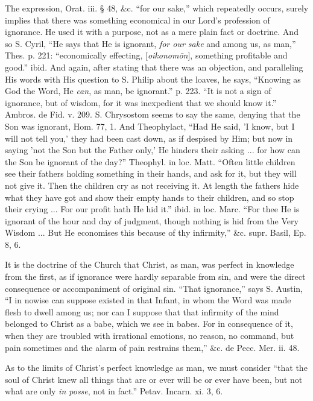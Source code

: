 The expression, Orat. iii. § 48, \&c. ``for
our sake,'' which repeatedly occurs, surely implies that there was
something economical in our Lord's profession of ignorance. He used
it with a purpose, not as a mere plain fact or doctrine. And so S.
Cyril, ``He says that He is ignorant, \emph{for our sake} and among
us, as man,'' Thes. p. 221: ``economically effecting, [\emph{oikonom\={o}n}],
something profitable and good.'' ibid. And again, after stating that
there was an objection, and paralleling His words with His question to
S. Philip about the loaves, he says, ``Knowing as God the Word, He \emph{can},
as man, be ignorant.'' p. 223. ``It is not a sign of ignorance, but
of wisdom, for it was inexpedient that we should know it.'' Ambros.
de Fid. v. 209. S. Chrysostom seems to say the same, denying that the
Son was ignorant, Hom. 77, 1. And Theophylact, ``Had He said, 'I
know, but I will not tell you,' they had been cast down, as if
despised by Him; but now in saying 'not the Son but the Father only,'
He hinders their asking ... for how can the Son be ignorant of the
day?'' Theophyl. in loc. Matt. ``Often little children see their
fathers holding something in their hands, and ask for it, but they
will not give it. Then the children cry as not receiving it. At length
the fathers hide what they have got and show their empty hands to
their children, and so stop their crying ... For our profit hath
He hid it.'' ibid. in loc. Marc. ``For thee He is ignorant of the
hour and day of judgment, though nothing is hid from the Very Wisdom
... But He economises this because of thy infirmity,'' \&c. supr.
Basil, Ep. 8, 6.

It is the doctrine of the Church that Christ, as
man, was perfect in knowledge from the first, as if ignorance were
hardly separable from sin, and were the direct consequence or
accompaniment of original sin. ``That ignorance,'' says S. Austin, ``I in nowise can suppose existed in that Infant, in whom the Word
was made flesh to dwell among us; nor can I suppose that that
infirmity of the mind belonged to Christ as a babe, which we see in
babes. For in consequence of it, when they are troubled with
irrational emotions, no reason, no command, but pain sometimes and the
alarm of pain restrains them,'' \&c. de Pecc. Mer. ii. 48.

As to the limits of Christ's perfect knowledge
as man, we must consider ``that the soul of Christ knew all things
that are or ever will be or ever have been, but not what are only \emph{in
posse}, not in fact.'' Petav. Incarn. xi. 3, 6.

